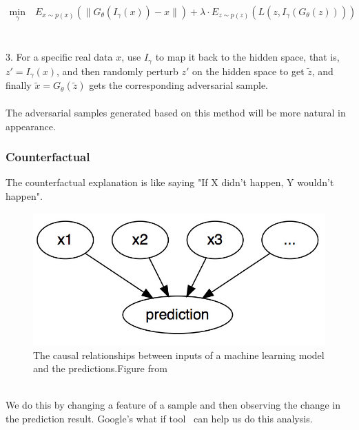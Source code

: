 \begin{equation}
\begin{aligned}
\underset{\gamma}{\mathrm{min}} \quad E_{x\sim p(x)}(\lVert G_\theta(I_\gamma(x)) - x\rVert) + \lambda\cdot E_{z\sim p(z)}(L(z,I_\gamma(G_\theta(z))))
\end{aligned}
\label{eqn:eq10}
\end{equation}
\\\\3. For a specific real data $x$, use $I_{\gamma}$ to map it back to the hidden space, that is, $z'=I_\gamma(x)$, and then randomly perturb $z'$ on the hidden space to get $\tilde{z}$, and finally $\tilde{x}=G_\theta(\tilde{z})$ gets the corresponding adversarial sample.
\\\\The adversarial samples generated based on this method will be more natural in appearance.

\subsubsection{Counterfactual}
The counterfactual explanation is like saying "If X didn't happen, Y wouldn't happen".
\begin{figure}[H]
\centering
\includegraphics[width=0.5\columnwidth]{gfx/counterfactual.jpg}
\caption{The causal relationships between inputs of a machine learning model and the predictions.Figure from ~\cite{molnar2019}}
\label{fig:counterfactual}
\end{figure}
~\\We do this by changing a feature of a sample and then observing the change in the prediction result. Google's what if tool~\cite{wexler2019whatif} can help us do this analysis.



